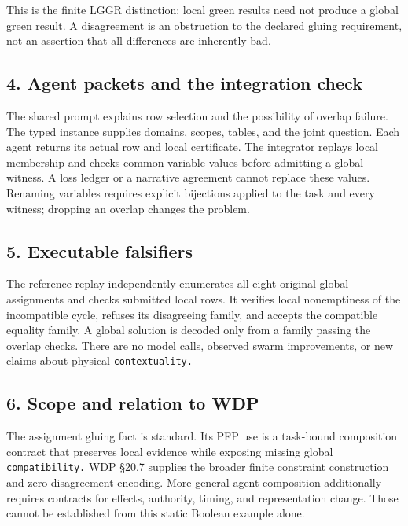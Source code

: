 \documentclass[
  11pt,
]{article}
\begin{document}
This is the finite LGGR distinction: local green results need not
produce a global green result. A disagreement is an obstruction to the
declared gluing requirement, not an assertion that all differences are
inherently bad.

\subsection{4. Agent packets and the integration
check}\label{agent-packets-and-the-integration-check}

The shared prompt explains row selection and the possibility of overlap
failure. The typed instance supplies domains, scopes, tables, and the
joint question. Each agent returns its actual row and local certificate.
The integrator replays local membership and checks common-variable
values before admitting a global witness. A loss ledger or a narrative
agreement cannot replace these values. Renaming variables requires
explicit bijections applied to the task and every witness; dropping an
overlap changes the problem.

\subsection{5. Executable falsifiers}\label{executable-falsifiers}

The \href{code/replay.py}{reference replay} independently enumerates all
eight original global assignments and checks submitted local rows. It
verifies local nonemptiness of the incompatible cycle, refuses its
disagreeing family, and accepts the compatible equality family. A global
solution is decoded only from a family passing the overlap checks. There
are no model calls, observed swarm improvements, or new claims about
physical \nolinkurl{contextuality.}

\subsection{6. Scope and relation to
WDP}\label{scope-and-relation-to-wdp}

The assignment gluing fact is standard. Its PFP use is a task-bound
composition contract that preserves local evidence while exposing
missing global \nolinkurl{compatibility.} WDP §20.7 supplies the broader
finite constraint construction and zero-disagreement encoding. More
general agent composition additionally requires contracts for effects,
authority, timing, and representation change. Those cannot be
established from this static Boolean example alone.
\end{document}
